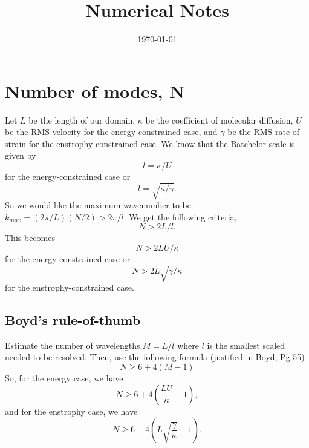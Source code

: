 \documentclass[12pt]{article}
\begin{document}
\title{Numerical Notes}
\author{}
\date{\today}

\maketitle


\section{Number of modes, N}
Let $L$ be the length of our domain, $\kappa$ be the coefficient of molecular diffusion, $U$ be the RMS velocity for the energy-constrained case, and $\gamma$ be the RMS rate-of-strain for the enstrophy-constrained case. We know that the Batchelor scale is given by 
\begin{equation}
l=\kappa/ U
\end{equation}
for the energy-constrained case or 
\begin{equation}
l=\sqrt{\kappa/\gamma}.
\end{equation}
So we would like the maximum wavenumber to be $k_{max}=(2\pi /L) (N/2) >2\pi/l$. We get the following criteria,
\begin{equation}
N > 2L/l.
\end{equation}
This becomes
\begin{equation}
N > 2L U/\kappa
\end{equation}
for the energy-constrained case or
\begin{equation}
N > 2L \sqrt{\gamma/ \kappa}
\end{equation}
for the enstrophy-constrained case.

\subsection{Boyd's rule-of-thumb}
Estimate the number of wavelengths,$M =L/l$ where $l$ is the smallest scaled needed to be resolved. Then, use the following formula (justified in Boyd, Pg 55)
\begin{equation}
N\geq6+4(M-1)
\end{equation}
So, for the energy case, we have
\begin{equation}
N\geq 6+4\left(\frac{LU}{\kappa}-1\right),
\end{equation}
and for the enstrophy case, we have
\begin{equation}
N\geq 6+4\left(L\sqrt{\frac{\gamma}{\kappa}}-1\right).
\end{equation}
\end{document}
